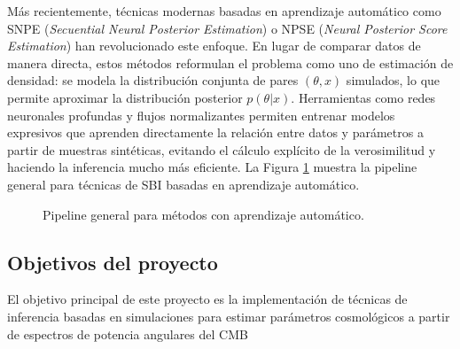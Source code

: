 Más recientemente, técnicas modernas basadas en aprendizaje automático como SNPE (\textit{Secuential Neural Posterior Estimation}) \cite{SNPE_C} o NPSE (\textit{Neural Posterior Score Estimation}) \cite{NPSE_1} \cite{NPSE_2} han revolucionado este enfoque. En lugar de comparar datos de manera directa, estos métodos reformulan el problema como uno de estimación de densidad: se modela la distribución conjunta de pares $(\theta, x)$ simulados, lo que permite aproximar la distribución posterior $p(\theta|x)$. Herramientas como redes neuronales profundas y flujos normalizantes permiten entrenar modelos expresivos que aprenden directamente la relación entre datos y parámetros a partir de muestras sintéticas, evitando el cálculo explícito de la verosimilitud y haciendo la inferencia mucho más eficiente. La Figura \ref{fig:npe} muestra la pipeline general para técnicas de SBI basadas en aprendizaje automático.

\begin{figure}[htbp]
    \centering
    \caption{Pipeline general para métodos con aprendizaje automático.}
    \label{fig:npe}
\end{figure}

\subsection{Objetivos del proyecto}
El objetivo principal de este proyecto es la implementación de técnicas de inferencia basadas en simulaciones para estimar parámetros cosmológicos a partir de espectros de potencia angulares del CMB



